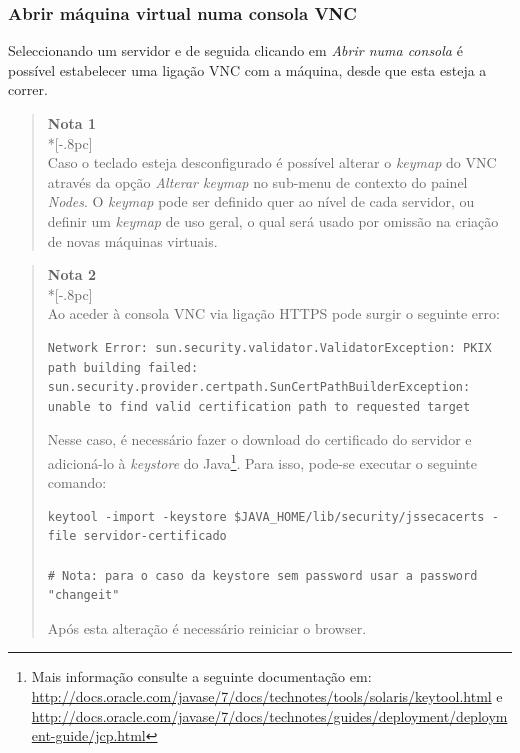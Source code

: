 \subsubsection{Abrir máquina virtual numa consola VNC}
\label{sec:open_vnc}

Seleccionando um servidor e de seguida clicando em \emph{Abrir numa consola} é possível estabelecer uma ligação VNC com a máquina, desde que esta esteja a correr.

\begin{quote}
	{\large \bf Nota 1} \\*[-.8pc]
	\underline{\hspace{6in}} \\
	Caso o teclado esteja desconfigurado é possível alterar o \emph{keymap} do VNC através da opção \emph{Alterar keymap} no sub-menu de contexto do painel \emph{Nodes}.
    O \emph{keymap} pode ser definido quer ao nível de cada servidor, ou definir um \emph{keymap} de uso geral, o qual será usado por omissão na criação de novas máquinas virtuais.
\end{quote}

\begin{quote}
	{\large \bf Nota 2} \\*[-.8pc]
	\underline{\hspace{6in}} \\
    Ao aceder à consola VNC via ligação HTTPS pode surgir o seguinte erro:

\begin{verbatim}
Network Error: sun.security.validator.ValidatorException: PKIX path building failed: sun.security.provider.certpath.SunCertPathBuilderException: unable to find valid certification path to requested target
\end{verbatim}

    Nesse caso, é necessário fazer o download do certificado do servidor e adicioná-lo à \emph{keystore} do Java\footnote{Mais informação consulte a seguinte documentação em: \url{http://docs.oracle.com/javase/7/docs/technotes/tools/solaris/keytool.html} e \url{http://docs.oracle.com/javase/7/docs/technotes/guides/deployment/deployment-guide/jcp.html} }.
    Para isso, pode-se executar o seguinte comando:

\begin{verbatim}
keytool -import -keystore $JAVA_HOME/lib/security/jssecacerts -file servidor-certificado

# Nota: para o caso da keystore sem password usar a password "changeit"
\end{verbatim}

    Após esta alteração é necessário reiniciar o browser.

\end{quote}

